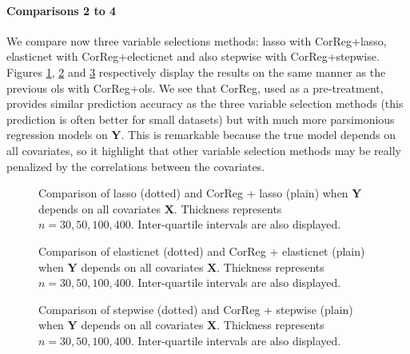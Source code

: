 \documentclass[11pt,a4paper]{article}
\begin{document}
\paragraph{Comparisons 2 to 4} We compare now three variable selections methods: {\sc lasso} with {\sc CorReg}+{\sc lasso}, elasticnet with {\sc CorReg}+electicnet and also stepwise with {\sc CorReg}+stepwise. Figures \ref{toutlar}, \ref{toutelast} and \ref{toutstepwise} respectively display the results on the same manner as the previous {\sc ols} with {\sc CorReg}+{\sc ols}. We see that {\sc CorReg}, used as a pre-treatment, provides similar prediction accuracy as the three variable selection methods (this prediction is often better for small datasets) but with much more parsimonious regression models on $\boldsymbol{Y}$. This is remarkable because the true model depends on all covariates, so it highlight that other variable selection methods may be really penalized by the correlations between the covariates.

\begin{figure}[h!]
	 \quad
	\caption{Comparison of {\sc lasso} (dotted) and {\sc CorReg} + {\sc lasso} (plain) when $\boldsymbol{Y}$ depends on all covariates ${\boldsymbol{X}}$. Thickness represents $n=30,50,100,400$.  Inter-quartile intervals are also displayed.}\label{toutlar}
\end{figure}

\begin{figure}[h!]
	 \quad
	\caption{Comparison of elasticnet (dotted) and {\sc CorReg} + elasticnet (plain)  when $\boldsymbol{Y}$ depends on all covariates ${\boldsymbol{X}}$. Thickness represents $n=30,50,100,400$.  Inter-quartile intervals are also displayed.}\label{toutelast}
\end{figure}


\begin{figure}[h!]
	 \quad
	\caption{Comparison of stepwise (dotted) and {\sc CorReg} + stepwise (plain)  when $\boldsymbol{Y}$ depends on all covariates ${\boldsymbol{X}}$. Thickness represents $n=30,50,100,400$.  Inter-quartile intervals are also displayed.}\label{toutstepwise}
\end{figure}
\end{document}
